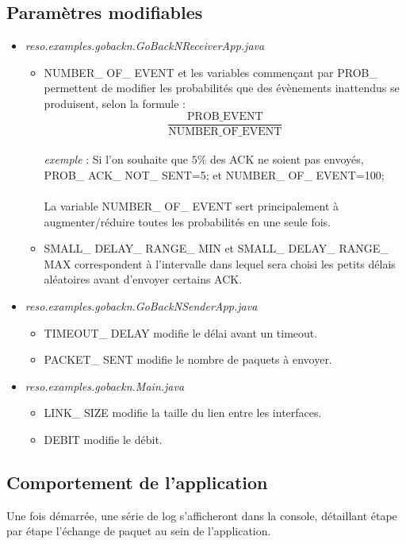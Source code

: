 \documentclass[]{article}
\begin{document}
\subsection{Paramètres modifiables}
\begin{itemize}
\item \emph{reso.examples.gobackn.GoBackNReceiverApp.java}
\begin{itemize}
\item NUMBER\_ OF\_ EVENT et les variables commençant par PROB\_ permettent de modifier les probabilités que des évènements inattendus se produisent, selon la formule : \[\frac{\text{PROB\_ EVENT}}{\text{NUMBER\_ OF\_ EVENT}}\]\\
\emph{exemple} : Si l'on souhaite que $5\%$ des ACK ne soient pas envoyés,\\ PROB\_ ACK\_ NOT\_ SENT=5; et NUMBER\_ OF\_ EVENT=100;\\\\
La variable NUMBER\_ OF\_ EVENT sert principalement à augmenter/réduire toutes les probabilités en une seule fois.
\item SMALL\_ DELAY\_ RANGE\_ MIN et SMALL\_ DELAY\_ RANGE\_ MAX correspondent à l'intervalle dans lequel sera choisi les petits délais aléatoires avant d'envoyer certains ACK.\\
\end{itemize}
\item \emph{reso.examples.gobackn.GoBackNSenderApp.java}
\begin{itemize}
\item TIMEOUT\_ DELAY modifie le délai avant un timeout.
\item PACKET\_ SENT modifie le nombre de paquets à envoyer.
\end{itemize}
\item \emph{reso.examples.gobackn.Main.java}
\begin{itemize}
\item LINK\_ SIZE modifie la taille du lien entre les interfaces.
\item DEBIT modifie le débit.
\end{itemize}
\end{itemize}
\subsection{Comportement de l'application}
Une fois démarrée, une série de log s'afficheront dans la console, détaillant étape par étape l'échange de paquet au sein de l'application.
\end{document}
